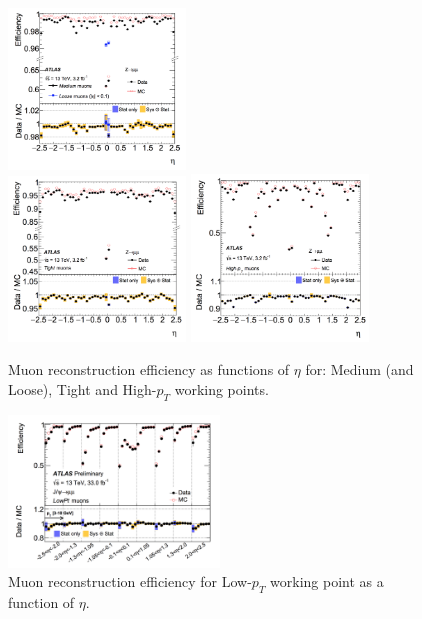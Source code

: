 \begin{figure}[!htb]
  \centering
  \includegraphics[width=0.42\textwidth]{figures/Simulation/muon_id_med.png} \\
  \includegraphics[width=0.42\textwidth]{figures/Simulation/muon_id_tight.png}
  \includegraphics[width=0.42\textwidth]{figures/Simulation/muon_id_highpT.png}
  \caption{Muon reconstruction efficiency as functions of $\eta$ for: Medium (and Loose), Tight and High-$p_{T}$ working points.}
  \label{fig:muon_id_eff}
\end{figure}

\begin{figure}[!htb]
  \centering
  \includegraphics[width=0.5\textwidth]{figures/Simulation/muon_id_lowpT.png}
  \caption{Muon reconstruction efficiency for Low-$p_{T}$ working point as a function of $\eta$.}
  \label{fig:muon_id_lowpt}
\end{figure}

